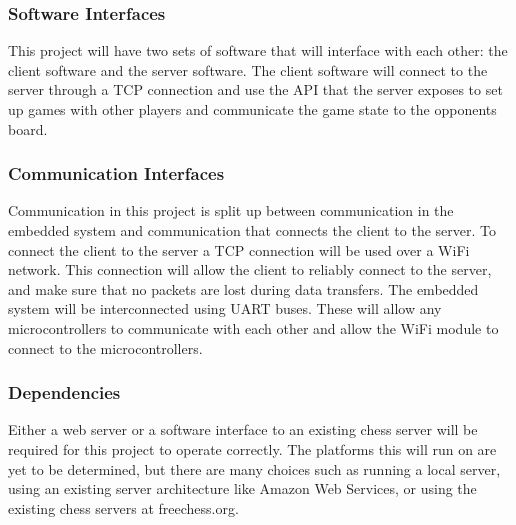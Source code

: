\documentclass{article}
\begin{document}
\subsubsection*{Software Interfaces}
\indent

This project will have two sets of software that will interface with each other: the client software and the server software. The client software will connect to the server through a TCP connection and use the API that the server exposes to set up games with other players and communicate the game state to the opponents board.

\subsubsection*{Communication Interfaces}
\indent

Communication in this project is split up between communication in the embedded system and communication that connects the client to the server. To connect the client to the server a TCP connection will be used over a WiFi network. This connection will allow the client to reliably connect to the server, and make sure that no packets are lost during data transfers. The embedded system will be interconnected using UART buses. These will allow any microcontrollers to communicate with each other and allow the WiFi module to connect to the microcontrollers.

\subsubsection*{Dependencies}
\indent

Either a web server or a software interface to an existing chess server will be required for this project to operate correctly. The platforms this will run on are yet to be determined, but there are many choices such as running a local server, using an existing server architecture like Amazon Web Services, or using the existing chess servers at freechess.org.
\end{document}
